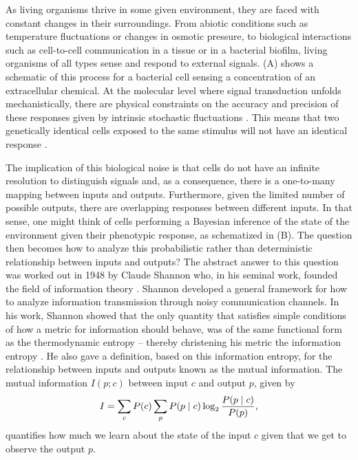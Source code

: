As living organisms thrive in some given environment, they are faced with
constant changes in their surroundings. From abiotic conditions such as
temperature fluctuations or changes in osmotic pressure, to biological
interactions such as cell-to-cell communication in a tissue or in a bacterial
biofilm, living organisms of all types sense and respond to external signals.
(A) shows a schematic of this process for a bacterial cell
sensing a concentration of an extracellular chemical. At the molecular level
where signal transduction unfolds mechanistically, there are physical
constraints on the accuracy and precision of these responses given by intrinsic
stochastic fluctuations \cite{Nemenman2010}. This means that two genetically
identical cells exposed to the same stimulus will not have an identical
response \cite{Eldar2010}.

The implication of this biological noise is that cells do not have an infinite
resolution to distinguish signals and, as a consequence, there is a one-to-many
mapping between inputs and outputs. Furthermore, given the limited number of
possible outputs, there are overlapping responses between different inputs. In
that sense, one might think of cells performing a Bayesian inference of the
state of the environment given their phenotypic response, as schematized in
(B). The question then becomes how to analyze this
probabilistic rather than deterministic relationship between inputs and
outputs? The abstract answer to this question was worked out in 1948 by Claude
Shannon who, in his seminal work, founded the field of information theory
\cite{Shannon1948}. Shannon developed a general framework for how to analyze
information transmission through noisy communication channels. In his work,
Shannon showed that the only quantity that satisfies simple conditions of how a
metric for information should behave, was of the same functional form as the
thermodynamic entropy -- thereby christening his metric the information entropy
\cite{MacKay2003}. He also gave a definition, based on this information
entropy, for the relationship between inputs and outputs known as the mutual
information. The mutual information $I(p; c)$ between input $c$ and output $p$,
given by
\begin{equation}
  I = \sum_c P(c) \sum_p P(p \mid c) \log_2 {P(p \mid c) \over P(p)},
	\label{eq_mutual_info}
\end{equation}
quantifies how much we learn about the state of the input $c$ given that we get
to observe the output $p$.


